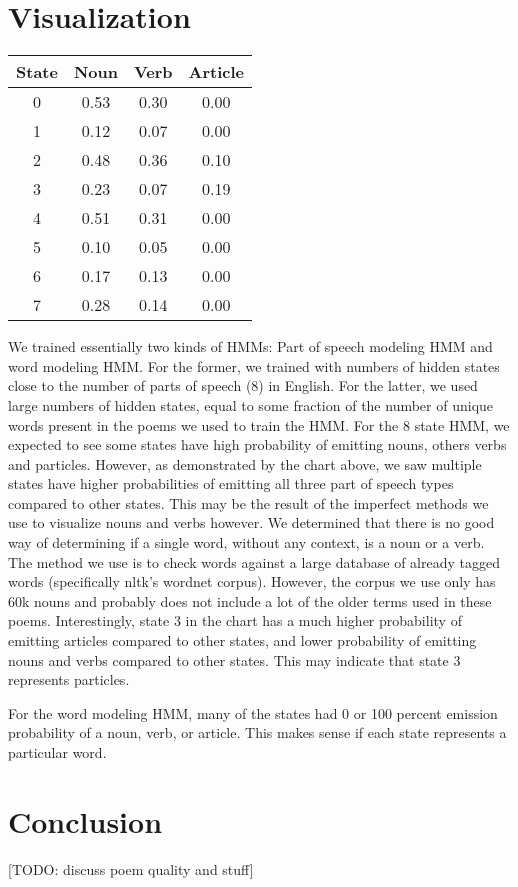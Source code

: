 \section{Visualization}
\begin{tabular}{|c|c|c|c|}
\hline 
State & Noun & Verb & Article \\ 
\hline 
0 & 0.53 & 0.30 & 0.00 \\ 
\hline 
1 & 0.12 & 0.07 & 0.00 \\ 
\hline 
2 & 0.48 & 0.36 & 0.10 \\ 
\hline 
3 & 0.23 & 0.07 & 0.19 \\ 
\hline 
4 & 0.51 & 0.31 & 0.00 \\ 
\hline 
5 & 0.10 & 0.05 & 0.00 \\ 
\hline 
6 & 0.17 & 0.13 & 0.00 \\ 
\hline 
7 & 0.28 & 0.14 & 0.00 \\ 
\hline 
\end{tabular} 

We trained essentially two kinds of HMMs: Part of speech modeling HMM and word modeling HMM. For the former, we trained with numbers of hidden states close to the number of parts of speech (8) in English. For the latter, we used large numbers of hidden states, equal to some fraction of the number of unique words present in the poems we used to train the HMM.  For the 8 state HMM, we expected to see some states have high probability of emitting nouns, others verbs and particles. However, as demonstrated by the chart above, we saw multiple states have higher probabilities of emitting all three part of speech types compared to other states. This may be the result of the imperfect methods we use to visualize nouns and verbs however. We determined that there is no good way of determining if a single word, without any context, is a noun or a verb. The method we use is to check words against a large database of already tagged words (specifically nltk's wordnet corpus). However, the corpus we use only has 60k nouns and probably does not include a lot of the older terms used in these poems. Interestingly, state 3 in the chart has a much higher probability of emitting articles compared to other states, and lower probability of emitting nouns and verbs compared to other states. This may indicate that state 3 represents particles. 

For the word modeling HMM, many of the states had 0 or 100 percent emission probability of a noun, verb, or article. This makes sense if each state represents a particular word. 
\section{Conclusion}
[TODO: discuss poem quality and stuff]



